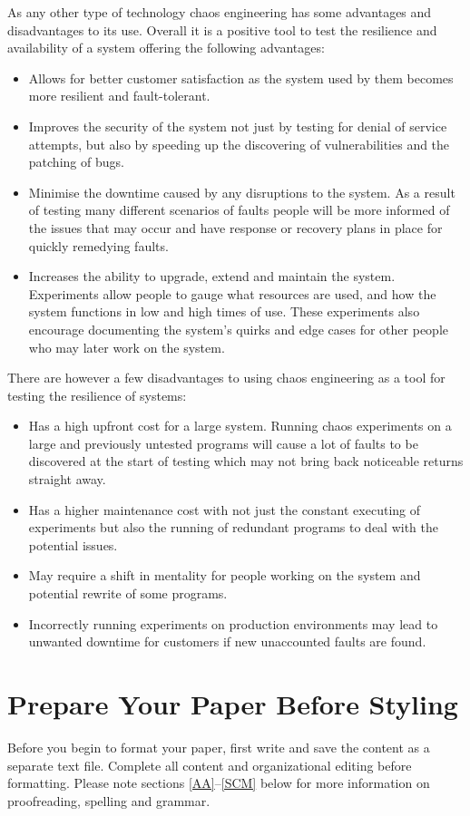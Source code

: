\documentclass[conference]{IEEEtran}
\begin{document}
As any other type of technology chaos engineering has some advantages and disadvantages to its use. Overall it is a positive tool to test the resilience and availability of a system offering the following advantages:
\begin{itemize}
	\item Allows for better customer satisfaction as the system used by them becomes more resilient and fault-tolerant.
	\item Improves the security of the system not just by testing for denial of service attempts, but also by speeding up the discovering of vulnerabilities and the patching of bugs.
	\item Minimise the downtime caused by any disruptions to the system. As a result of testing many different scenarios of faults people will be more informed of the issues that may occur and have response or recovery plans in place for quickly remedying faults.
	\item Increases the ability to upgrade, extend and maintain the system. Experiments allow people to gauge what resources are used, and how the system functions in low and high times of use. These experiments also encourage documenting the system's quirks and edge cases for other people who may later work on the system.
\end{itemize}
There are however a few disadvantages to using chaos engineering as a tool for testing the resilience of systems:
\begin{itemize}
	\item Has a high upfront cost for a large system. Running chaos experiments on a large and previously untested programs will cause a lot of faults to be discovered at the start of testing which may not bring back noticeable returns straight away. 
	\item Has a higher maintenance cost with not just the constant executing of experiments but also the running of redundant programs to deal with the potential issues.
	\item May require a shift in mentality for people working on the system and potential rewrite of some programs.
	\item Incorrectly running experiments on production environments may lead to unwanted downtime for customers if new unaccounted faults are found. \cite{b2}
\end{itemize}

\section{Prepare Your Paper Before Styling}
Before you begin to format your paper, first write and save the content as a 
separate text file. Complete all content and organizational editing before 
formatting. Please note sections \ref{AA}--\ref{SCM} below for more information on 
proofreading, spelling and grammar.
\end{document}
